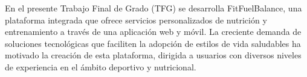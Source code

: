 En el presente Trabajo Final de Grado (TFG) se desarrolla FitFuelBalance, una plataforma integrada que ofrece servicios personalizados de nutrición y entrenamiento a través de una aplicación web y móvil. La creciente demanda de soluciones tecnológicas que faciliten la adopción de estilos de vida saludables ha motivado la creación de esta plataforma, dirigida a usuarios con diversos niveles de experiencia en el ámbito deportivo y nutricional.